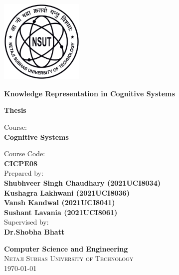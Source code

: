 \newcommand{\university}{Netaji Subhas University of Technology}
\newcommand{\department}{Computer Science and Engineering}

\begin{titlepage}
 \begin{center}
		\includegraphics[width=0.30\textwidth]{images/logo.png}\\
		\normalsize

		\vspace{0.5cm}

		\Huge
		\textbf{Knowledge Representation in Cognitive Systems}
		\normalsize

		\vfill
		\textbf{\large Thesis } \\
		\vspace{0.6cm}

		Course: \\ \textbf{Cognitive Systems}\\
		\vspace{0.8cm}


		Course Code: \\ \textbf{CICPE08}\\
		\vspace{0.8cm}
		Prepared by: \\
		\large
		\textbf{Shubhveer Singh Chaudhary (2021UCI8034)\\
  Kushagra Lakhwani (2021UCI8036)\\
  Vansh Kandwal (2021UCI8041)\\
  Sushant Lavania (2021UCI8061)}\\

		\normalsize
		\vspace{0.8cm}
		Supervised by:\\
		\large
		\textbf{Dr.Shobha Bhatt}\\
		\vspace{0.3cm}
		\normalsize

		\vfill
		\large
		\textbf{\department} \\

		\normalsize
		\vfill
		\textsc{\large \university}\\[1ex]
		{\large \today}
	\end{center}
\end{titlepage}

